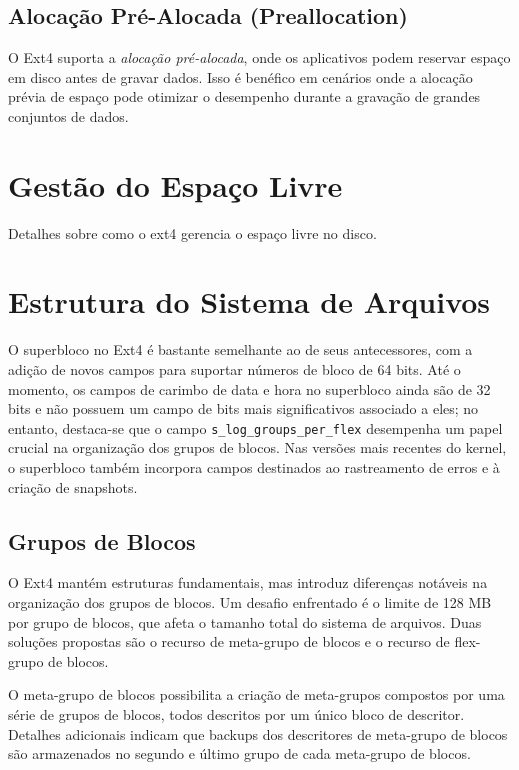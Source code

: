 \documentclass[
	12pt,				%
	openright,			%
	oneside,			%
	a4paper,			%
	chapter=TITLE,		%
	english,			%
	french,				%
	spanish,			%
	brazil				%
	]{abntex2}
\theoremstyle{definition}
\begin{document}
\section{Alocação Pré-Alocada (Preallocation)}
O Ext4 suporta a \textit{alocação pré-alocada}, onde os aplicativos podem reservar espaço em disco antes de gravar dados. Isso é benéfico em cenários onde a alocação prévia de espaço pode otimizar o desempenho durante a gravação de grandes conjuntos de dados.

\chapter{Gestão do Espaço Livre}
Detalhes sobre como o ext4 gerencia o espaço livre no disco.

\chapter{Estrutura do Sistema de Arquivos}

O superbloco no Ext4 é bastante semelhante ao de seus antecessores, com a adição de novos campos para 
suportar números de bloco de 64 bits. Até o momento, os campos de carimbo de data e hora no superbloco 
ainda são de 32 bits e não possuem um campo de bits mais significativos associado a eles; no entanto, 
destaca-se que o campo \texttt{s\_log\_groups\_per\_flex} desempenha um papel crucial na organização 
dos grupos de blocos. Nas versões mais recentes do kernel, o superbloco também incorpora campos 
destinados ao rastreamento de erros e à criação de snapshots.


\section{Grupos de Blocos}
O Ext4 mantém estruturas fundamentais, mas introduz diferenças notáveis na organização dos grupos 
de blocos. Um desafio enfrentado é o limite de 128 MB por grupo de blocos, que afeta o tamanho total 
do sistema de arquivos. Duas soluções propostas são o recurso de meta-grupo de blocos e o recurso de 
flex-grupo de blocos.

O meta-grupo de blocos possibilita a criação de meta-grupos compostos por uma série de grupos de 
blocos, todos descritos por um único bloco de descritor. Detalhes adicionais indicam que backups 
dos descritores de meta-grupo de blocos são armazenados no segundo e último grupo de cada meta-grupo de blocos.
\end{document}
